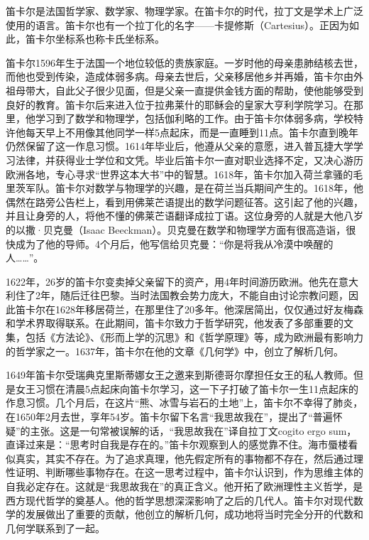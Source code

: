 \documentclass[b5paper]{ctexart}
\begin{document}
\begin{mdframed}
笛卡尔是法国哲学家、数学家、物理学家。在笛卡尔的时代，拉丁文是学术上广泛使用的语言。笛卡尔也有一个拉丁化的名字——卡提修斯（Cartesius）。正因为如此，笛卡尔坐标系也称卡氏坐标系。

笛卡尔1596年生于法国一个地位较低的贵族家庭。一岁时他的母亲患肺结核去世，而他也受到传染，造成体弱多病。母亲去世后，父亲移居他乡并再婚，笛卡尔由外祖母带大，自此父子很少见面，但是父亲一直提供金钱方面的帮助，使他能够受到良好的教育。笛卡尔后来进入位于拉弗莱什的耶稣会的皇家大亨利学院学习。在那里，他学习到了数学和物理学，包括伽利略的工作。由于笛卡尔体弱多病，学校特许他每天早上不用像其他同学一样5点起床，而是一直睡到11点。笛卡尔直到晚年仍然保留了这一作息习惯。1614年毕业后，他遵从父亲的意愿，进入普瓦捷大学学习法律，并获得业士学位和文凭。毕业后笛卡尔一直对职业选择不定，又决心游历欧洲各地，专心寻求“世界这本大书”中的智慧。1618年，笛卡尔加入荷兰拿骚的毛里茨军队。笛卡尔对数学与物理学的兴趣，是在荷兰当兵期间产生的。1618年，他偶然在路旁公告栏上，看到用佛莱芒语提出的数学问题征答。这引起了他的兴趣，并且让身旁的人，将他不懂的佛莱芒语翻译成拉丁语。这位身旁的人就是大他八岁的以撒·贝克曼（Isaac Beeckman）。贝克曼在数学和物理学方面有很高造诣，很快成为了他的导师。4个月后，他写信给贝克曼：“你是将我从冷漠中唤醒的人……”。

1622年，26岁的笛卡尔变卖掉父亲留下的资产，用4年时间游历欧洲。他先在意大利住了2年，随后迁往巴黎。当时法国教会势力庞大，不能自由讨论宗教问题，因此笛卡尔在1628年移居荷兰，在那里住了20多年。他深居简出，仅仅通过好友梅森和学术界取得联系。在此期间，笛卡尔致力于哲学研究，他发表了多部重要的文集，包括《方法论》、《形而上学的沉思》和《哲学原理》等，成为欧洲最有影响力的哲学家之一。1637年，笛卡尔在他的文章《几何学》中，创立了解析几何。

1649年笛卡尔受瑞典克里斯蒂娜女王之邀来到斯德哥尔摩担任女王的私人教师。但是女王习惯在清晨5点起床向笛卡尔学习，这一下子打破了笛卡尔一生11点起床的作息习惯。几个月后，在这片“熊、冰雪与岩石的土地”上，笛卡尔不幸得了肺炎，在1650年2月去世，享年54岁。笛卡尔留下名言“我思故我在”，提出了“普遍怀疑”的主张。这是一句常被误解的话，“我思故我在”译自拉丁文cogito ergo sum，直译过来是：“思考时自我是存在的。”笛卡尔观察到人的感觉靠不住。海市蜃楼看似真实，其实不存在。为了追求真理，他先假定所有的事物都不存在，然后通过理性证明、判断哪些事物存在。在这一思考过程中，笛卡尔认识到，作为思维主体的自我必定存在。这就是“我思故我在”的真正含义。他开拓了欧洲理性主义哲学，是西方现代哲学的奠基人。他的哲学思想深深影响了之后的几代人。笛卡尔对现代数学的发展做出了重要的贡献，他创立的解析几何，成功地将当时完全分开的代数和几何学联系到了一起。
\end{mdframed}
\end{document}
